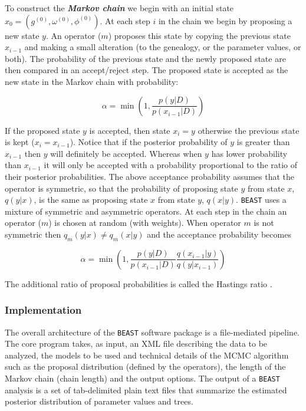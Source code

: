 \documentclass[cup7b, english]{cupbook}
\begin{document}
To construct the \textbf{\textit{Markov chain}} we begin with an initial state
$x_0 = (g^{(0)}, \omega^{(0)}, \phi^{(0)})$. At each step $i$ in the chain we begin
by proposing a new state $y$. An operator ($m$) proposes this state by copying
the previous state $x_{i-1}$ and making a small alteration (to the genealogy, or the parameter values, or both).
The probability of the previous state and the newly proposed state are then compared in an accept/reject step.
The proposed state is accepted as the new state in the Markov chain with probability:

\begin{equation}
\alpha = \min \left(1,\frac{p(y|D)}{p(x_{i-1}|D)} \right)
\end{equation}

If the proposed state $y$ is accepted, then state $x_i = y$ otherwise the previous
state is kept ($x_i = x_{i-1}$). Notice that if the posterior probability of $y$ is greater than $x_{i-1}$
then $y$ will definitely be accepted. Whereas when $y$ has lower probability than $x_{i-1}$ it
will only be accepted with a probability proportional to the ratio of their posterior probabilities.
The above acceptance probability assumes that the operator is symmetric, so that
the probability of proposing state $y$ from state $x$, $q(y|x)$, is the same as proposing state $x$ from
state $y$, $q(x|y)$. \texttt{BEAST} uses a mixture of symmetric and asymmetric operators. At each step in the chain
an operator ($m$) is chosen at random (with weights). When operator $m$ is
not symmetric then $q_m(y|x) \neq q_m(x|y)$ and the acceptance probability becomes

\begin{equation}
\alpha = \min \left(1,\frac{p(y|D)}{p(x_{i-1}|D)}\frac{q(x_{i-1}|y)}{q(y|x_{i-1})}\right)
\end{equation}

The additional ratio of proposal probabilities is called the Hastings ratio \cite{Hastings1970}.

\subsubsection{Implementation}

The overall architecture of the \texttt{BEAST} software package is a file-mediated
pipeline. The core program takes, as input, an XML file describing
the data to be analyzed, the models to be used and technical details
of the MCMC algorithm such as the proposal distribution (defined by the operators),
the length of the Markov chain (chain length) and the output options. The output of a \texttt{BEAST} analysis
is a set of tab-delimited plain text files that summarize the estimated
posterior distribution of parameter values and trees.
\end{document}
